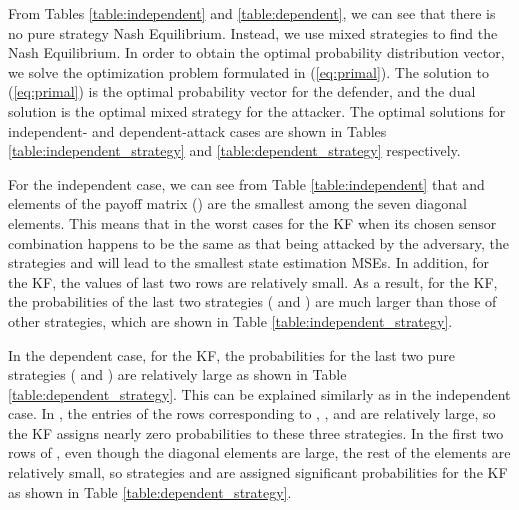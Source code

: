 \documentclass{article}
\begin{document}
From  Tables \ref{table:independent} and   \ref{table:dependent}, we can see that there is no pure strategy Nash Equilibrium. Instead, we  use mixed strategies to find the Nash Equilibrium. In order to obtain  the optimal probability distribution vector,  we solve the optimization problem formulated in (\ref{eq:primal}).
The  solution to (\ref{eq:primal}) is the optimal probability vector for the defender, and the   dual solution is the optimal mixed strategy for the attacker. The optimal  solutions for  independent- and dependent-attack cases are shown in Tables \ref{table:independent_strategy} and \ref{table:dependent_strategy} respectively.  

For the independent case, we can see from Table \ref{table:independent} that   and  elements of the payoff matrix () are the smallest among the seven diagonal elements. This means that in the worst cases for the KF when its chosen sensor combination happens to be  the same as that being attacked by the adversary,  the strategies    and   will lead to the smallest state estimation MSEs.  In addition,  for the KF, the values of last two rows are relatively small. As a result, for the KF, the probabilities of  the last two strategies ( and ) are much larger  than those of other strategies, which are shown in Table \ref{table:independent_strategy}. 

In the dependent case, for the KF, the probabilities for the last two pure strategies ( and ) are relatively large as  shown in Table \ref{table:dependent_strategy}. This can be explained similarly as in the independent case.   In , the entries of the  rows corresponding to , , and   are relatively large, so the KF assigns nearly zero probabilities to these three strategies. In  the first two rows of , even though the diagonal elements are large, the rest of the elements are relatively small, so strategies  and  are assigned significant probabilities for the KF as shown in Table \ref{table:dependent_strategy}.



 
\end{document}
